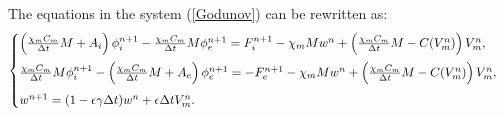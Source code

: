 \documentclass[a4paper,11pt]{article}
\begin{document}
The equations in the system (\ref{Godunov}) can be rewritten as:
\begin{equation*}
\begin{cases}
\left( \frac{\chi_m C_m}{\Delta t} M + A_i \right ) \phi_i^{n+1} - \frac{\chi_m C_m}{\Delta t} M \phi_e^{n+1} = F_i^{n+1} - \chi_m M w^n + \left( \frac{\chi_m C_m}{\Delta t} M- C(V_m^n)\right) V_m^n,\vspace{2mm}\\
\frac{\chi_m C_m}{\Delta t} M  \phi_i^{n+1} - \left(\frac{\chi_m C_m}{\Delta t} M + A_e \right) \phi_e^{n+1} =  -F_e^{n+1} - \chi_m M w^n + \left( \frac{\chi_m C_m}{\Delta t} M- C(V_m^n)\right) V_m^n, \vspace{2mm}\\
w^{n+1} = (1-\epsilon \gamma \Delta t) w^n + \epsilon \Delta tV_m^n.
\end{cases}
\end{equation*}
\end{document}
